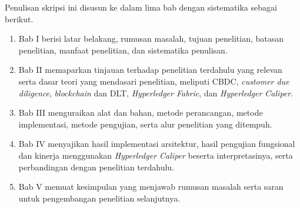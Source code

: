 \begin{samepage}
Penulisan skripsi ini disusun ke dalam lima bab dengan sistematika sebagai berikut.
\begin{enumerate}
	\item Bab I berisi latar belakang, rumusan masalah, tujuan penelitian, batasan penelitian, manfaat penelitian, dan sistematika penulisan.
	\item Bab II memaparkan tinjauan terhadap penelitian terdahulu yang relevan serta dasar teori yang mendasari penelitian, meliputi CBDC, \textit{customer due diligence}, \textit{blockchain} dan DLT, \textit{Hyperledger Fabric}, dan \textit{Hyperledger Caliper}.
	\item Bab III menguraikan alat dan bahan, metode perancangan, metode implementasi, metode pengujian, serta alur penelitian yang ditempuh.
	\item Bab IV menyajikan hasil implementasi arsitektur, hasil pengujian fungsional dan kinerja menggunakan \textit{Hyperledger Caliper} beserta interpretasinya, serta perbandingan dengan penelitian terdahulu.
	\item Bab V memuat kesimpulan yang menjawab rumusan masalah serta saran untuk pengembangan penelitian selanjutnya.
\end{enumerate}
\end{samepage}
